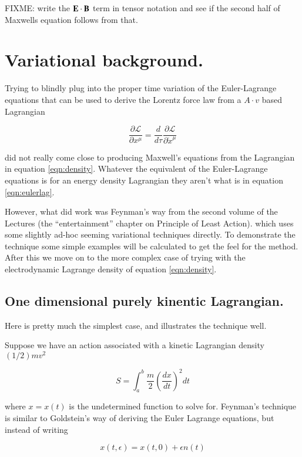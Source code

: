 \documentclass{article}
\newcommand{\LL}[0]{\mathcal{L}}
\newcommand{\PD}[2]{\frac{\partial {#2}}{\partial {#1}}}
\begin{document}
FIXME: write the $\mathbf{E} \cdot \mathbf{B}$ term in tensor notation and see if the second half of Maxwells equation follows from that.

\section{ Variational background. }

Trying to blindly plug into the proper time variation of the Euler-Lagrange equations that can be used to derive the Lorentz force law from a $A \cdot v$ based Lagrangian

\begin{equation}\label{eqn:eulerlag}
\PD{x^\mu}{\LL} = \frac{d}{d\tau} \PD{\dot{x}^\mu}{\LL}
\end{equation}

did not really come close to producing Maxwell's equations from the Lagrangian in equation \ref{eqn:density}.  Whatever the equivalent of the Euler-Lagrange equations is for an energy density Lagrangian they aren't what is in equation \ref{eqn:eulerlag}.

However, what did work was Feynman's way from the second volume of the Lectures (the ``entertainment'' chapter on Principle of Least Action).
which uses some slightly ad-hoc seeming variational techniques directly.  To demonstrate the technique some simple examples
will be calculated to get the feel for the method.  After this we move on to the more complex case of trying with the electrodynamic Lagrange
density of equation \ref{eqn:density}.

\subsection{ One dimensional purely kinentic Lagrangian. }

Here is pretty much the simplest case, and illustrates the technique well.

Suppose we have an action associated with a kinetic Lagrangian density $(1/2) m v^2$

\begin{equation}\label{eqn:oneDimKinetic}
S = \int_a^b \frac{m}{2} { \left(\frac{dx}{dt}\right) }^2 dt
\end{equation}

where $x = x(t)$ is the undetermined function to solve for.  Feynman's technique is similar to Goldstein's way of deriving the Euler Lagrange equations, but instead of writing

\begin{equation*}
x(t, \epsilon) = x(t, 0) + \epsilon n(t)
\end{equation*}
\end{document}
